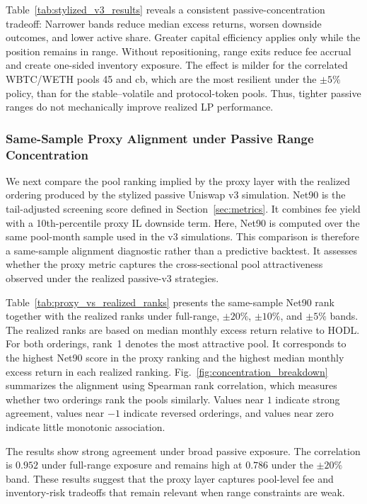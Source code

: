 \documentclass[10pt,conference,compsocconf]{IEEEtran}
\begin{document}
Table~\ref{tab:stylized_v3_results} reveals a consistent passive-concentration tradeoff: Narrower bands reduce median excess returns, worsen downside outcomes, and lower active share. Greater capital efficiency applies only while the position remains in range. Without repositioning, range exits reduce fee accrual and create one-sided inventory exposure.
The effect is milder for the correlated WBTC/WETH pools 45 and cb, which
are the most resilient under the $\pm5\%$ policy, than for the stable--volatile and protocol-token pools. Thus, tighter passive ranges do not mechanically improve realized LP performance.


\subsubsection{Same-Sample Proxy Alignment under Passive Range Concentration}
\label{subsubsec:proxy_vs_realized}

We next compare the pool ranking implied by the proxy layer with the realized ordering produced by the stylized passive Uniswap v3 simulation. Net90 is the tail-adjusted screening score defined in Section~\ref{sec:metrics}. It combines fee yield with a 10th-percentile proxy IL downside term. Here, Net90 is computed over the same pool-month sample used in the v3 simulations. This comparison is therefore a same-sample alignment diagnostic rather than a predictive backtest. It assesses whether the proxy metric captures the cross-sectional pool attractiveness observed under the realized passive-v3 strategies.

Table~\ref{tab:proxy_vs_realized_ranks} presents the same-sample Net90 rank together with the realized ranks under full-range, $\pm20\%$, $\pm10\%$, and $\pm5\%$ bands. The realized ranks are based on median monthly excess return relative to HODL. For both orderings, rank~1 denotes the most attractive pool. It corresponds to the highest Net90 score in the proxy ranking and the highest median monthly excess return in each realized ranking. Fig.~\ref{fig:concentration_breakdown} summarizes the alignment using Spearman rank correlation, which measures whether two orderings rank the pools similarly. Values near $1$ indicate strong agreement, values near $-1$ indicate reversed orderings, and values near zero indicate little monotonic association.

The results show strong agreement under broad passive exposure. The correlation is $0.952$ under full-range exposure and remains high at $0.786$ under the $\pm20\%$ band. These results suggest that the proxy layer captures pool-level fee and inventory-risk tradeoffs that remain relevant when range constraints are weak.
\end{document}
